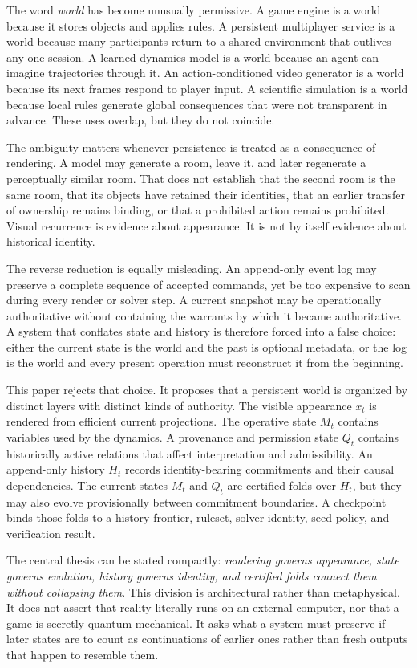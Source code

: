 \documentclass[11pt]{article}
\begin{document}
The word \emph{world} has become unusually permissive. A game engine is a world because it stores objects and applies rules. A persistent multiplayer service is a world because many participants return to a shared environment that outlives any one session. A learned dynamics model is a world because an agent can imagine trajectories through it. An action-conditioned video generator is a world because its next frames respond to player input. A scientific simulation is a world because local rules generate global consequences that were not transparent in advance. These uses overlap, but they do not coincide.

The ambiguity matters whenever persistence is treated as a consequence of rendering. A model may generate a room, leave it, and later regenerate a perceptually similar room. That does not establish that the second room is the same room, that its objects have retained their identities, that an earlier transfer of ownership remains binding, or that a prohibited action remains prohibited. Visual recurrence is evidence about appearance. It is not by itself evidence about historical identity.

The reverse reduction is equally misleading. An append-only event log may preserve a complete sequence of accepted commands, yet be too expensive to scan during every render or solver step. A current snapshot may be operationally authoritative without containing the warrants by which it became authoritative. A system that conflates state and history is therefore forced into a false choice: either the current state is the world and the past is optional metadata, or the log is the world and every present operation must reconstruct it from the beginning.

This paper rejects that choice. It proposes that a persistent world is organized by distinct layers with distinct kinds of authority. The visible appearance $x_t$ is rendered from efficient current projections. The operative state $M_t$ contains variables used by the dynamics. A provenance and permission state $Q_t$ contains historically active relations that affect interpretation and admissibility. An append-only history $H_t$ records identity-bearing commitments and their causal dependencies. The current states $M_t$ and $Q_t$ are certified folds over $H_t$, but they may also evolve provisionally between commitment boundaries. A checkpoint binds those folds to a history frontier, ruleset, solver identity, seed policy, and verification result.

The central thesis can be stated compactly: \emph{rendering governs appearance, state governs evolution, history governs identity, and certified folds connect them without collapsing them}. This division is architectural rather than metaphysical. It does not assert that reality literally runs on an external computer, nor that a game is secretly quantum mechanical. It asks what a system must preserve if later states are to count as continuations of earlier ones rather than fresh outputs that happen to resemble them.
\end{document}
